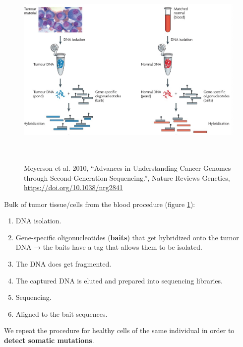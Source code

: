 \begin{figure}[H]
  \includegraphics[width=6.18343in,height=3.84729in]{image9.jpeg}
  \centering
  \caption{Meyerson et al. 2010, ``Advances in Understanding Cancer Genomes
  through Second-Generation Sequencing.'', Nature Reviews Genetics,
  \url{https://doi.org/10.1038/nrg2841}}
  \label{fig: DNA variants}
\end{figure}

Bulk of tumor tissue/cells from the blood procedure (figure \ref{fig: DNA variants}):


\begin{enumerate}
\def\labelenumi{\arabic{enumi})}
\item
  DNA isolation.
\item
  Gene-specific oligonucleotides (\textbf{baits}) that get hybridized onto the
  tumor DNA → the baits have a tag that allows them to be isolated.
\item
  The DNA does get fragmented.
\item
  The captured DNA is eluted and prepared into sequencing libraries.
\item
  Sequencing.
\item
  Aligned to the bait sequences.
\end{enumerate}


We repeat the procedure for healthy cells of the same individual in order to
\textbf{detect somatic mutations}.


